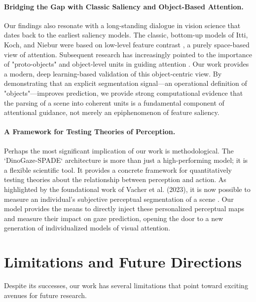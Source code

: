 \paragraph{Bridging the Gap with Classic Saliency and Object-Based Attention.} Our findings also resonate with a long-standing dialogue in vision science that dates back to the earliest saliency models. The classic, bottom-up models of Itti, Koch, and Niebur were based on low-level feature contrast \cite{itti1998}, a purely space-based view of attention. Subsequent research has increasingly pointed to the importance of "proto-objects" and object-level units in guiding attention \cite{10.1371/journal.pcbi.1011512}. Our work provides a modern, deep learning-based validation of this object-centric view. By demonstrating that an explicit segmentation signal—an operational definition of "objects"—improves prediction, we provide strong computational evidence that the parsing of a scene into coherent units is a fundamental component of attentional guidance, not merely an epiphenomenon of feature saliency.

\paragraph{A Framework for Testing Theories of Perception.} Perhaps the most significant implication of our work is methodological. The `DinoGaze-SPADE` architecture is more than just a high-performing model; it is a flexible scientific tool. It provides a concrete framework for quantitatively testing theories about the relationship between perception and action. As highlighted by the foundational work of Vacher et al. (2023), it is now possible to measure an individual's subjective perceptual segmentation of a scene \cite{vacher2023measuring}. Our model provides the means to directly inject these personalized perceptual maps and measure their impact on gaze prediction, opening the door to a new generation of individualized models of visual attention.

\section{Limitations and Future Directions}
\label{sec:discussion_future}

Despite its successes, our work has several limitations that point toward exciting avenues for future research.

